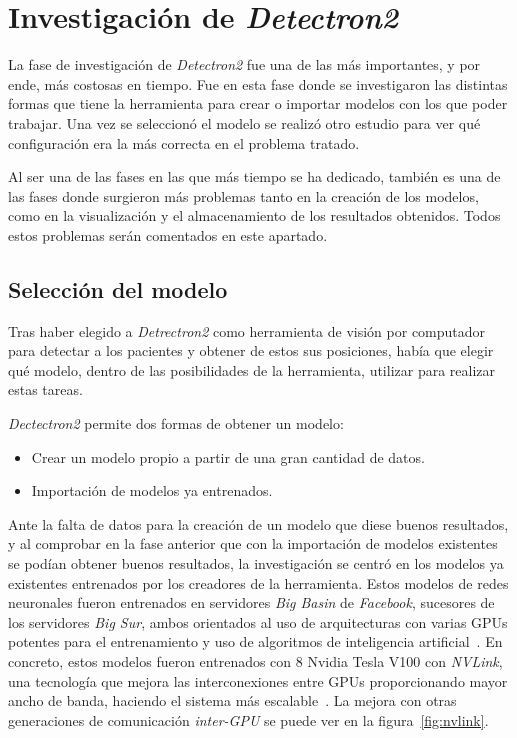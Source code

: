 {\section{Investigación de \textit{Detectron2}}
La fase de investigación de \textit{Detectron2} fue una de las más importantes, y por ende, más costosas en tiempo. Fue en esta fase donde se investigaron las distintas formas que tiene la herramienta para crear o importar modelos con los que poder trabajar. Una vez se seleccionó el modelo se realizó otro estudio para ver qué configuración era la más correcta en el problema tratado.

Al ser una de las fases en las que más tiempo se ha dedicado, también es una de las fases donde surgieron más problemas tanto en la creación de los modelos, como en la visualización y el almacenamiento de los resultados obtenidos. Todos estos problemas serán comentados en este apartado.  
\subsection{Selección del modelo}
Tras haber elegido a \textit{Detrectron2} como herramienta de visión por computador para detectar a los pacientes y obtener de estos sus posiciones, había que elegir qué modelo, dentro de las posibilidades de la herramienta, utilizar para realizar estas tareas.

\textit{Dectectron2} permite dos formas de obtener un modelo:
\begin{itemize}
	\item Crear un modelo propio a partir de una gran cantidad de datos.
	\item Importación de modelos ya entrenados.
\end{itemize}

Ante la falta de datos para la creación de un modelo que diese buenos resultados, y al comprobar en la fase anterior que con la importación de modelos existentes se podían obtener buenos resultados, la investigación se centró en los modelos ya existentes entrenados por los creadores de la herramienta. Estos modelos de redes neuronales fueron entrenados en servidores \textit{Big Basin} de \textit{Facebook}, sucesores de los servidores \textit{Big Sur}, ambos orientados al uso de arquitecturas con varias GPUs potentes para el entrenamiento y uso de algoritmos de inteligencia artificial~\cite{bigbasin}. En concreto, estos modelos fueron entrenados con 8 Nvidia Tesla V100 con \textit{NVLink}, una tecnología que mejora las interconexiones entre GPUs proporcionando mayor ancho de banda, haciendo el sistema más escalable~\cite{nvlink}. La mejora con otras generaciones de comunicación \textit{inter-GPU} se puede ver en la figura~\ref{fig:nvlink}.

}
